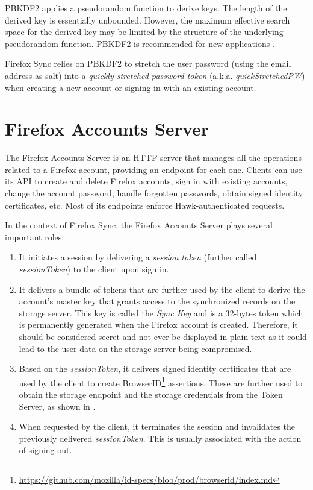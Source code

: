 PBKDF2 applies a pseudorandom function to derive keys. The length of the derived key is essentially unbounded. However, the maximum effective search space for the derived key may be limited by the structure of the underlying pseudorandom function. PBKDF2 is recommended for new applications \cite{kaliski2000pkcs}.

Firefox Sync relies on PBKDF2 to stretch the user password (using the email address as salt) into a \textit{quickly stretched password token} (a.k.a. \textit{quickStretchedPW}) when creating a new account or signing in with an existing account.

\section{Firefox Accounts Server}
\label{sec:firefox-accounts-server}

The Firefox Accounts Server is an HTTP server that manages all the operations related to a Firefox account, providing an endpoint for each one. Clients can use its API to create and delete Firefox accounts, sign in with existing accounts, change the account password, handle forgotten passwords, obtain signed identity certificates, etc. Most of its endpoints enforce Hawk-authenticated requests.

In the context of Firefox Sync, the Firefox Accounts Server plays several important roles:
\begin{enumerate}
  \item It initiates a session by delivering a \textit{session token} (further called \textit{sessionToken}) to the client upon sign in.

  \item It delivers a bundle of tokens that are further used by the client to derive the account's master key that grants access to the synchronized records on the storage server. This key is called the \textit{Sync Key} and is a 32-bytes token which is permanently generated when the Firefox account is created. Therefore, it should be considered secret and not ever be displayed in plain text as it could lead to the user data on the storage server being compromised.

  \item Based on the \textit{sessionToken}, it delivers signed identity certificates that are used by the client to create BrowserID\footnote{\url{https://github.com/mozilla/id-specs/blob/prod/browserid/index.md}} assertions. These are further used to obtain the storage endpoint and the storage credentials from the Token Server, as shown in .

  \item When requested by the client, it terminates the session and invalidates the previously delivered \textit{sessionToken}. This is usually associated with the action of signing out.
\end{enumerate}

